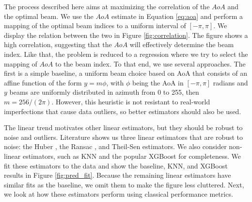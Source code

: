 \documentclass[10pt,comsoc]{IEEEtran}
\begin{document}
The process described here aims at maximizing the correlation of the $AoA$ and the optimal beam. We use the $AoA$ estimate in Equation \eqref{eq:aoa} and perform a mapping of the optimal beam indices to a uniform interval of $[-\pi, \pi]$. We display the relation between the two in Figure \ref{fig:correlation}. The figure shows a high correlation, suggesting that the $AoA$ will effectively determine the beam index. Like that, the problem is reduced to a regression where we try to select the mapping of $AoA$ to the beam index. To that end, we use several approaches. The first is a simple baseline, a uniform beam choice based on AoA that consists of an affine function of the form $y = m \phi$, with $\phi$ being the AoA in $[-\pi, \pi]$ radians and $y$ beams are uniformly distributed in azimuth from 0 to 255, then $m = 256 / (2 \pi)$. However, this heuristic is not resistant to real-world imperfections that cause data outliers, so better estimators should also be used.

The linear trend motivates other linear estimators, but they should be robust to noise and outliers. Literature shows us three linear estimators that are robust to noise: the Huber \cite{Huber}, the Ransac \cite{RANSAC}, and Theil-Sen \cite{Theil-Sen} estimators. We also consider non-linear estimators, such as KNN and the popular XGBoost \cite{XGBoost} for completeness. We fit these estimators to the data and show the baseline, KNN, and XGBoost results in Figure \ref{fig:pred_fit}. Because the remaining linear estimators have similar fits as the baseline, we omit them to make the figure less cluttered. Next, we look at how these estimators perform using classical performance metrics. 
\end{document}
